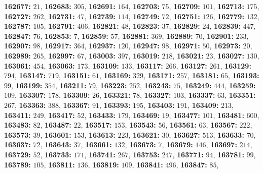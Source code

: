 \textsf{\bfseries 162677:} $21$, \textsf{\bfseries 162683:} $305$, \textsf{\bfseries 162691:} $164$, \textsf{\bfseries 162703:} $75$, \textsf{\bfseries 162709:} $101$, \textsf{\bfseries 162713:} $175$, \textsf{\bfseries 162727:} $262$, \textsf{\bfseries 162731:} $47$, \textsf{\bfseries 162739:} $114$, \textsf{\bfseries 162749:} $72$, \textsf{\bfseries 162751:} $126$, \textsf{\bfseries 162779:} $132$, \textsf{\bfseries 162787:} $105$, \textsf{\bfseries 162791:} $406$, \textsf{\bfseries 162821:} $48$, \textsf{\bfseries 162823:} $37$, \textsf{\bfseries 162829:} $24$, \textsf{\bfseries 162839:} $447$, \textsf{\bfseries 162847:} $76$, \textsf{\bfseries 162853:} $7$, \textsf{\bfseries 162859:} $57$, \textsf{\bfseries 162881:} $369$, \textsf{\bfseries 162889:} $70$, \textsf{\bfseries 162901:} $233$, \textsf{\bfseries 162907:} $98$, \textsf{\bfseries 162917:} $364$, \textsf{\bfseries 162937:} $120$, \textsf{\bfseries 162947:} $98$, \textsf{\bfseries 162971:} $50$, \textsf{\bfseries 162973:} $20$, \textsf{\bfseries 162989:} $265$, \textsf{\bfseries 162997:} $67$, \textsf{\bfseries 163003:} $397$, \textsf{\bfseries 163019:} $218$, \textsf{\bfseries 163021:} $23$, \textsf{\bfseries 163027:} $130$, \textsf{\bfseries 163061:} $454$, \textsf{\bfseries 163063:} $173$, \textsf{\bfseries 163109:} $133$, \textsf{\bfseries 163117:} $266$, \textsf{\bfseries 163127:} $261$, \textsf{\bfseries 163129:} $794$, \textsf{\bfseries 163147:} $719$, \textsf{\bfseries 163151:} $61$, \textsf{\bfseries 163169:} $329$, \textsf{\bfseries 163171:} $257$, \textsf{\bfseries 163181:} $65$, \textsf{\bfseries 163193:} $99$, \textsf{\bfseries 163199:} $354$, \textsf{\bfseries 163211:} $79$, \textsf{\bfseries 163223:} $252$, \textsf{\bfseries 163243:} $75$, \textsf{\bfseries 163249:} $444$, \textsf{\bfseries 163259:} $109$, \textsf{\bfseries 163307:} $178$, \textsf{\bfseries 163309:} $26$, \textsf{\bfseries 163321:} $78$, \textsf{\bfseries 163327:} $103$, \textsf{\bfseries 163337:} $63$, \textsf{\bfseries 163351:} $267$, \textsf{\bfseries 163363:} $388$, \textsf{\bfseries 163367:} $91$, \textsf{\bfseries 163393:} $195$, \textsf{\bfseries 163403:} $191$, \textsf{\bfseries 163409:} $213$, \textsf{\bfseries 163411:} $249$, \textsf{\bfseries 163417:} $52$, \textsf{\bfseries 163433:} $179$, \textsf{\bfseries 163469:} $19$, \textsf{\bfseries 163477:} $101$, \textsf{\bfseries 163481:} $600$, \textsf{\bfseries 163483:} $82$, \textsf{\bfseries 163487:} $22$, \textsf{\bfseries 163517:} $153$, \textsf{\bfseries 163543:} $56$, \textsf{\bfseries 163561:} $63$, \textsf{\bfseries 163567:} $222$, \textsf{\bfseries 163573:} $39$, \textsf{\bfseries 163601:} $153$, \textsf{\bfseries 163613:} $223$, \textsf{\bfseries 163621:} $30$, \textsf{\bfseries 163627:} $513$, \textsf{\bfseries 163633:} $70$, \textsf{\bfseries 163637:} $72$, \textsf{\bfseries 163643:} $37$, \textsf{\bfseries 163661:} $132$, \textsf{\bfseries 163673:} $7$, \textsf{\bfseries 163679:} $146$, \textsf{\bfseries 163697:} $214$, \textsf{\bfseries 163729:} $52$, \textsf{\bfseries 163733:} $171$, \textsf{\bfseries 163741:} $267$, \textsf{\bfseries 163753:} $247$, \textsf{\bfseries 163771:} $94$, \textsf{\bfseries 163781:} $99$, \textsf{\bfseries 163789:} $105$, \textsf{\bfseries 163811:} $136$, \textsf{\bfseries 163819:} $109$, \textsf{\bfseries 163841:} $496$, \textsf{\bfseries 163847:} $85$, 
